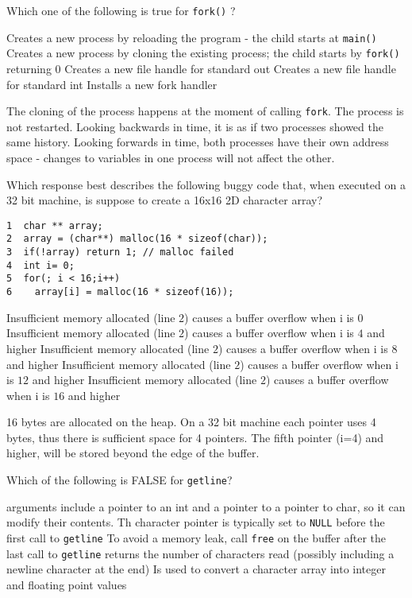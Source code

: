 \variant
Which one of the following is true for {\tt fork()} ?
\begin{answers}
\answer Creates a new process by reloading the program - the child starts at {\tt main() }
\correctanswer Creates a new process by cloning the existing process; the child starts by {\tt fork()} returning $0$
\answer Creates a new file handle for standard out
\answer Creates a new file handle for standard int
\answer Installs a new fork handler
\end{answers}
\begin{solution}
The cloning of the process happens at the moment of calling {\tt fork}. The process is not restarted. Looking backwards in time, it is as if two processes showed the same history. Looking forwards in time, both processes have their own address space - changes to variables in one process will not affect the other.
\end{solution}


\variant
Which response best describes the following buggy code that, when executed on a 32 bit machine, is suppose to create a 16x16 2D character array?
\begin{verbatim}
1  char ** array;
2  array = (char**) malloc(16 * sizeof(char));
3  if(!array) return 1; // malloc failed
4  int i= 0;
5  for(; i < 16;i++) 
6    array[i] = malloc(16 * sizeof(16));
\end{verbatim}
\begin{answers}
\answer Insufficient memory allocated (line $2$) causes a buffer overflow when i is $0$
\correctanswer Insufficient memory allocated (line $2$) causes a buffer overflow when i is $4$ and higher
\answer Insufficient memory allocated (line $2$) causes a buffer overflow when i is $8$ and higher
\answer Insufficient memory allocated (line $2$) causes a buffer overflow when i is $12$ and higher
\answer Insufficient memory allocated (line $2$) causes a buffer overflow when i is $16$ and higher
\end{answers}
\begin{solution}
16 bytes are allocated on the heap. On a 32 bit machine each pointer uses 4 bytes, thus there is sufficient space for 4 pointers. The fifth pointer (i=4) and higher, will be stored beyond the edge of the buffer.
\end{solution}



\variant
Which of the following is FALSE for {\tt getline}?
\begin{answers}
 arguments include a pointer to an int and a pointer to a pointer to char, so it can modify their contents.
\answer Th character pointer is typically set to {\tt NULL} before the first call to {\tt getline}
\answer To avoid a memory leak, call {\tt free} on the buffer after the last call to {\tt getline}
 returns the number of characters read (possibly including a newline character at the end)
\correctanswer Is used to convert a character array into integer and floating point values
\end{answers}
\begin{solution}
\end{solution}



